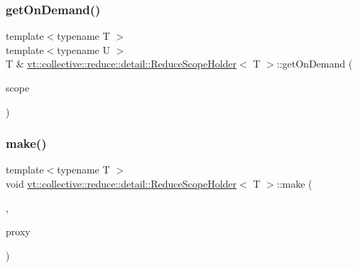 \mbox{\label{structvt_1_1collective_1_1reduce_1_1detail_1_1_reduce_scope_holder_a47aca26691aaff13b240cb2109b189dc}} 
\subsubsection{\texorpdfstring{get\+On\+Demand()}{getOnDemand()}}
{\footnotesize\ttfamily template$<$typename T $>$ \\
template$<$typename U $>$ \\
T \& \hyperlink{structvt_1_1collective_1_1reduce_1_1detail_1_1_reduce_scope_holder}{vt\+::collective\+::reduce\+::detail\+::\+Reduce\+Scope\+Holder}$<$ T $>$\+::get\+On\+Demand (\begin{DoxyParamCaption}\item[{U \&\&}]{scope }\end{DoxyParamCaption})}

\mbox{\label{structvt_1_1collective_1_1reduce_1_1detail_1_1_reduce_scope_holder_a0226c973a9bc67754fe5ce3076cb077e}} 
\subsubsection{\texorpdfstring{make()}{make()}\hspace{0.1cm}{\footnotesize\ttfamily [1/2]}}
{\footnotesize\ttfamily template$<$typename T $>$ \\
void \hyperlink{structvt_1_1collective_1_1reduce_1_1detail_1_1_reduce_scope_holder}{vt\+::collective\+::reduce\+::detail\+::\+Reduce\+Scope\+Holder}$<$ T $>$\+::make (\begin{DoxyParamCaption}\item[{\hyperlink{structvt_1_1collective_1_1reduce_1_1detail_1_1_reduce_scope_holder_1_1_obj_group_tag}{Obj\+Group\+Tag}}]{,  }\item[{\hyperlink{namespacevt_ad7cae989df485fccca57f0792a880a8e}{Obj\+Group\+Proxy\+Type}}]{proxy }\end{DoxyParamCaption})}

